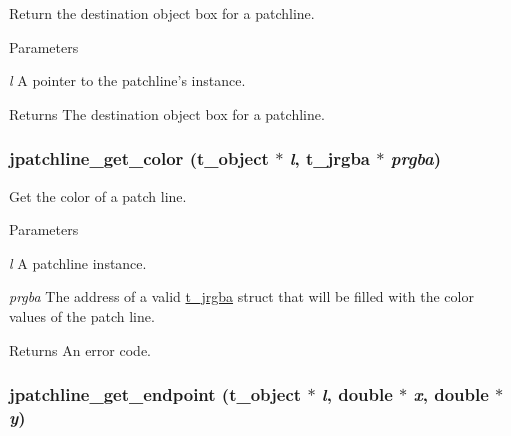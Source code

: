 Return the destination object box for a patchline. 
\begin{DoxyParams}{Parameters}
\item[{\em l}]A pointer to the patchline's instance. \end{DoxyParams}
\begin{DoxyReturn}{Returns}
The destination object box for a patchline. 
\end{DoxyReturn}
\hypertarget{group__jpatchline_ga9f612329fb1b675345173e56b0da8b5e}{
\subsubsection[{jpatchline\_\-get\_\-color}]{ jpatchline\_\-get\_\-color ({\bf t\_\-object} $\ast$ {\em l}, \/  {\bf t\_\-jrgba} $\ast$ {\em prgba})}}
\label{group__jpatchline_ga9f612329fb1b675345173e56b0da8b5e}


Get the color of a patch line. 
\begin{DoxyParams}{Parameters}
\item[{\em l}]A patchline instance. \item[{\em prgba}]The address of a valid \hyperlink{structt__jrgba}{t\_\-jrgba} struct that will be filled with the color values of the patch line. \end{DoxyParams}
\begin{DoxyReturn}{Returns}
An error code. 
\end{DoxyReturn}
\hypertarget{group__jpatchline_gae3975e752f1b21493cd7546d081e82ab}{
\subsubsection[{jpatchline\_\-get\_\-endpoint}]{ jpatchline\_\-get\_\-endpoint ({\bf t\_\-object} $\ast$ {\em l}, \/  double $\ast$ {\em x}, \/  double $\ast$ {\em y})}}
\label{group__jpatchline_gae3975e752f1b21493cd7546d081e82ab}


